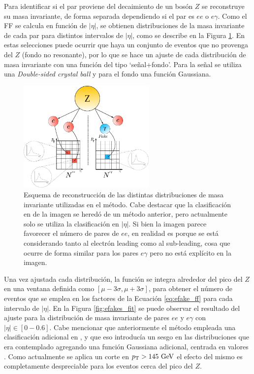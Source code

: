 Para identificar si el par proviene del decaimiento de un bosón $Z$ se reconstruye su masa invariante, de forma separada dependiendo si el par es $ee$ o $e\gamma$. Como el FF se calcula en función de $|\eta|$, se obtienen distribuciones de la masa invariante de cada par para distintos intervalos de $|\eta|$, como se describe en la Figura \ref{fig:efakes_matrix}. En estas selecciones puede ocurrir que haya un conjunto de eventos que no provenga del $Z$ (fondo no resonante), por lo que se hace un ajuste de cada distribución de masa invariante con una función del tipo `señal+fondo'. Para la señal se utiliza una \textit{Double-sided crystal ball}  y para el fondo una función Gaussiana.

\begin{figure}
  \centering
  \includegraphics[width=0.6\textwidth]{images/analysis/grid_en_2.pdf}
  \caption{Esquema de reconstrucción de las distintas distribuciones de masa invariante utilizadas en el método. Cabe destacar que la clasificación en \pt de la imagen se heredó de un método anterior, pero actualmente solo se utiliza la clasificación en $|\eta|$. Si bien la imagen parece favorecer el número de pares de $ee$, en realidad es porque se está considerando tanto al electrón leading como al sub-leading, cosa que ocurre de forma similar para los pares $e\gamma$ pero no está explícito en la imagen.}
  \label{fig:efakes_matrix}
\end{figure}

Una vez ajustada cada distribución, la función se integra alrededor del pico del $Z$ en una ventana definida como $[\mu - 3\sigma, \mu + 3\sigma]$, para obtener el número de eventos que se emplea en los factores de la Ecuación \ref{eq:efake_ff} para cada intervalo de $|\eta|$. En la Figura \ref{fig:efakes_fit} se puede observar el resultado del ajuste para la distribución de masa invariante de pares $ee$ y $e\gamma$ con $|\eta| \in [0-0.6]$. Cabe mencionar que anteriormente el método empleada una clasificación adicional en \pt, y que eso introducía un sesgo en las distribuciones que era contemplado agregando una función Gaussiana adicional, centrada en valores . Como actualmente se aplica un corte en $p_{\text{T}}>145\ \text{GeV}$ el efecto del mismo es completamente despreciable para los eventos cerca del pico del $Z$.

